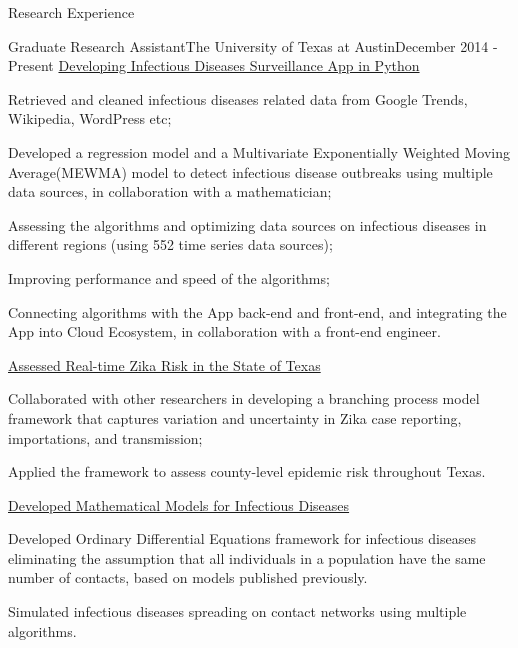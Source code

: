 \documentclass{my_resume} %
\begin{document}

\begin{rSection}{Research Experience}

\begin{rSubsection}{Graduate Research Assistant}{The
    University of Texas at Austin}{December 2014 - Present}
  \underline{Developing Infectious Diseases Surveillance App in Python}
  \item Retrieved and cleaned infectious diseases related data from Google
    Trends, Wikipedia, WordPress etc;
  \item Developed a regression model and a Multivariate Exponentially Weighted
    Moving Average(MEWMA) model to detect infectious disease outbreaks using
    multiple data sources, in collaboration with a mathematician;
  \item Assessing the algorithms and optimizing data sources on infectious
    diseases in different regions (using 552 time series data sources);
  \item Improving performance and speed of the algorithms;
  \item Connecting algorithms with the App back-end and front-end, and
    integrating the App into Cloud Ecosystem, in collaboration with a front-end
    engineer.

  \underline{Assessed Real-time Zika Risk in the State of Texas}
  \item Collaborated with other researchers in developing a branching process
    model framework that captures variation and uncertainty in Zika case
    reporting, importations, and transmission;
  \item Applied the framework to assess county-level epidemic risk throughout
    Texas.

  \underline{Developed Mathematical Models for Infectious Diseases}
  \item Developed Ordinary Differential Equations framework for infectious diseases
    eliminating the assumption that all individuals in a population have the
    same number of contacts, based on models published previously.
  \item Simulated infectious diseases spreading on contact networks using
    multiple algorithms.
\end{rSubsection}
\end{rSection}
\end{document}
